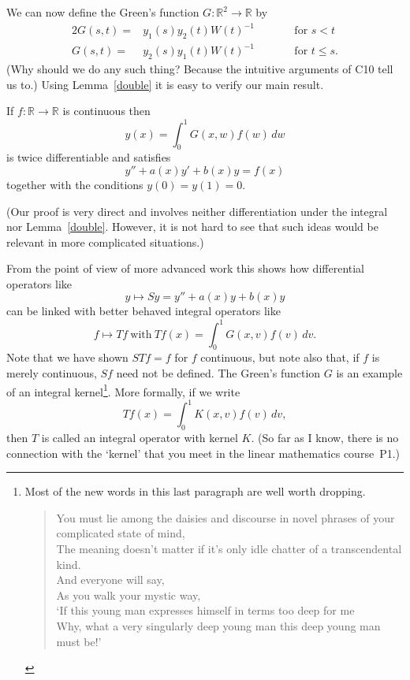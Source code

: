 We can now define the Green's function 
$G:{\mathbb R}^{2}\rightarrow{\mathbb R}$ by
\begin{alignat*}{2}
G(s,t)=&y_{1}(s)y_{2}(t)W(t)^{-1}&&\qquad\text{for $s<t$}\\
G(s,t)=&y_{2}(s)y_{1}(t)W(t)^{-1}&&\qquad\text{for $t\leq s$.}
\end{alignat*}
(Why should we do any such thing? Because the intuitive
arguments of C10 tell us to.) Using Lemma~\ref{double}
it is easy to verify our main result.
\begin{theorem} If $f:{\mathbb R}\rightarrow{\mathbb R}$
is continuous then
\[y(x)=\int_{0}^{1}G(x,w)f(w)\,dw\]
is twice differentiable and satisfies
\begin{equation*}
y''+a(x)y'+b(x)y=f(x) \tag*{$(*)$}
\end{equation*}
together with the conditions $y(0)=y(1)=0$.
\end{theorem}
(Our proof is very direct and involves neither differentiation
under the integral nor Lemma~\ref{double}. However,
it is not hard to see that such ideas would
be relevant in more complicated situations.)

From the point of view of more advanced work
this shows how differential operators like
\[y\mapsto Sy=y''+a(x)y+b(x)y\]
can be linked with better behaved integral
operators like
\[f\mapsto Tf \ \text{with}\ Tf(x)=\int_{0}^{1}G(x,v)f(v)\,dv.\]
Note that we have shown $STf=f$ for $f$ continuous,
but note also
that, if $f$ is merely continuous, $Sf$ need not
be defined. The Green's function $G$ is an example
of an integral kernel\footnote{Most of the new words
in this last paragraph are well worth dropping.
\begin{verse}
You must lie among the daisies and discourse in novel
phrases of your complicated state of mind,\\
The meaning doesn't matter if it's only idle chatter
of a transcendental kind.\\
And everyone will say,\\
As you walk your mystic way,\\
`If this young man expresses himself in terms too deep for
me\\
Why, what a very singularly deep young man this deep
young man must be!'
\end{verse}}. More formally, if we
write
\[Tf(x)=\int_{0}^{1}K(x,v)f(v)\,dv,\]
then $T$ is called an integral operator with kernel $K$.
(So far as I know, there is no connection with the
`kernel' that you meet in the linear mathematics course~P1.)



